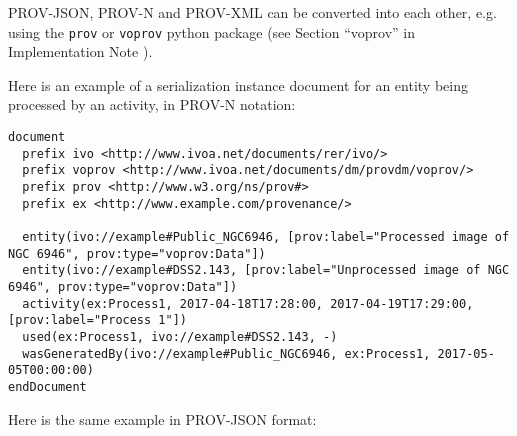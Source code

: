 



PROV-JSON, PROV-N and PROV-XML can be converted into each other, e.g.  using the \texttt{prov} or \texttt{voprov} python package (see Section ``voprov'' in Implementation Note \citep{std:ProvenanceImplementationNote}).

Here is an example of a serialization instance document for an entity being processed by an activity, in PROV-N notation:

\begin{verbatim}
document
  prefix ivo <http://www.ivoa.net/documents/rer/ivo/>
  prefix voprov <http://www.ivoa.net/documents/dm/provdm/voprov/>
  prefix prov <http://www.w3.org/ns/prov#>
  prefix ex <http://www.example.com/provenance/>

  entity(ivo://example#Public_NGC6946, [prov:label="Processed image of NGC 6946", prov:type="voprov:Data"])
  entity(ivo://example#DSS2.143, [prov:label="Unprocessed image of NGC 6946", prov:type="voprov:Data"])
  activity(ex:Process1, 2017-04-18T17:28:00, 2017-04-19T17:29:00, [prov:label="Process 1"])
  used(ex:Process1, ivo://example#DSS2.143, -)
  wasGeneratedBy(ivo://example#Public_NGC6946, ex:Process1, 2017-05-05T00:00:00)
endDocument
\end{verbatim}

\noindent
Here is the same example in PROV-JSON format:

